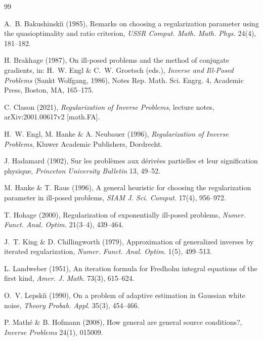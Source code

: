 \documentclass[a4paper]{report}
\theoremstyle{plain}
\theoremstyle{definition}
\theoremstyle{remark}
\begin{document}
 
\begin{thebibliography}{99}

A.~B. Bakushinski{\u\i} (1985), Remarks on choosing a regularization parameter using the
quasioptimality and ratio criterion, \emph{USSR Comput. Math. Math. Phys.} 24(4),
181--182.

H. Brakhage (1987), On ill-posed problems and the method of conjugate gradients, in:
H.~W. Engl \& C.~W. Groetsch (eds.), \emph{Inverse and Ill-Posed Problems} (Sankt
Wolfgang, 1986), Notes Rep. Math. Sci. Engrg. 4, Academic Press, Boston, MA, 165--175.

C. Clason (2021), \emph{Regularization of Inverse Problems}, lecture notes,
arXiv:2001.00617v2 [math.FA].

H.~W. Engl, M. Hanke \& A. Neubauer (1996), \emph{Regularization of Inverse Problems},
Kluwer Academic Publishers, Dordrecht.

J. Hadamard (1902), Sur les probl\`emes aux d\'eriv\'ees partielles et leur signification
physique, \emph{Princeton University Bulletin} 13, 49--52.

M. Hanke \& T. Raus (1996), A general heuristic for choosing the regularization
parameter in ill-posed problems, \emph{SIAM J. Sci. Comput.} 17(4), 956--972.

T. Hohage (2000), Regularization of exponentially ill-posed problems,
\emph{Numer. Funct. Anal. Optim.} 21(3--4), 439--464.

J.~T. King \& D. Chillingworth (1979), Approximation of generalized inverses by
iterated regularization, \emph{Numer. Funct. Anal. Optim.} 1(5), 499--513.

L. Landweber (1951), An iteration formula for Fredholm integral equations of the first
kind, \emph{Amer. J. Math.} 73(3), 615--624.

O.~V. Lepski{\u\i} (1990), On a problem of adaptive estimation in Gaussian white noise,
\emph{Theory Probab. Appl.} 35(3), 454--466.

P. Math\'e \& B. Hofmann (2008), How general are general source conditions?,
\emph{Inverse Problems} 24(1), 015009.


\end{thebibliography}
\end{document}
